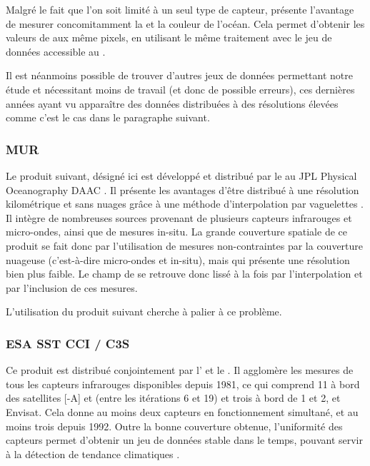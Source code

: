 \documentclass[index]{subfiles}
\begin{document}
Malgré le fait que l'on soit limité à un seul type de capteur,  présente l'avantage de mesurer concomitamment la  et la couleur de l'océan.
Cela permet d'obtenir les valeurs de  aux même pixels, en utilisant le même traitement avec le jeu de données accessible au  \parencite{chl_modis}.

Il est néanmoins possible de trouver d'autres jeux de données permettant notre étude et nécessitant moins de travail (et donc de possible erreurs), ces dernières années ayant vu apparaître des données distribuées à des résolutions élevées comme c'est le cas dans le paragraphe suivant.

\subsubsection{MUR}
\label{sec:donnees-sst-ghrsst}

Le produit suivant, désigné ici  est développé et distribué par le  au JPL Physical Oceanography DAAC \parencite{sst_mur}.
Il présente les avantages d'être distribué à une résolution kilométrique et sans nuages grâce à une méthode d'interpolation par vaguelettes \parencite{chin_2017}.
Il intègre de nombreuses sources provenant de plusieurs capteurs infrarouges et micro-ondes, ainsi que de mesures in-situ.
La grande couverture spatiale de ce produit se fait donc par l'utilisation de mesures non-contraintes par la couverture nuageuse (c'est-à-dire micro-ondes et in-situ), mais qui présente une résolution bien plus faible.
Le champ de  se retrouve donc lissé à la fois par l'interpolation et par l'inclusion de ces mesures.

L'utilisation du produit suivant cherche à palier à ce problème.

\subsubsection{ESA SST CCI / C3S}
\label{sec:donnees-sst-esacci}

Ce produit est distribué conjointement par l'   et le .
Il agglomère les mesures de tous les capteurs infrarouges disponibles depuis 1981, ce qui comprend 11  à bord des satellites [-A] et  (entre les itérations 6 et 19) et trois  à bord de  1 et 2, et Envisat.
Cela donne au moins deux capteurs en fonctionnement simultané, et au moins trois depuis 1992.
Outre la bonne couverture obtenue, l'uniformité des capteurs permet d'obtenir un jeu de données stable dans le temps, pouvant servir à la détection de tendance climatiques \parencite{merchant_2019}.
\end{document}
